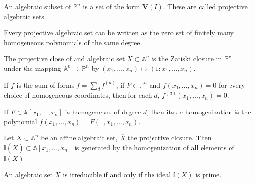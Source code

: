                 \begin{definition}
                    An algebraic subset of $\mathbb{P}^{n}$ is a
                    set of the form $\mathbf{V}(I)$.
                    These are called projective algebraic sets.
                \end{definition}
                \begin{theorem}
                    Every projective algebraic set can be
                    written as the zero set of finitely many
                    homogeneous polynomials of the same degree.
                \end{theorem}
                \begin{definition}
                    The projective close of and algebraic set
                    $X\subset\mathbb{A}^n$ is the Zariski closure
                    in $\mathbb{P}^{n}$ under the mapping
                    $\mathbb{A}^{n}\rightarrow\mathbb{P}^n$
                    by $(x_{1},\hdots,x_{n})\mapsto(1:x_1,\hdots, x_n)$.
                \end{definition}
                \begin{theorem}
                    If $f$ is the sum of forms $f=\sum_{d}f^{(d)}$,
                    if $P\in \mathbb{P}^n$ and $f(x_1,\hdots, x_n)=0$
                    for every choice of homogeneous coordinates,
                    then for each $d$, $f^{(d)}(x_1,\hdots, x_n)=0$.
                \end{theorem}
                \begin{definition}
                    If $F\in \mathbb{A}[x_1,\hdots, x_n]$ is homogeneous
                    of degree $d$, then its de-homogenization is the
                    polynomial $f(x_1,\hdots, x_n)=F(1,x_1,\hdots, x_n)$.
                \end{definition}
                \begin{theorem}
                    Let $X\subset \mathbb{A}^n$ be an affine
                    algebraic set, $\overline{X}$ the projective closure. Then
                    $\mathbb{I}(\overline{X})\subset\mathbb{A}[x_1,\hdots,x_n]$
                    is generated by the homogenization of all
                    elements of $\mathbb{I}(X)$.
                \end{theorem}
                \begin{theorem}
                    An algebraic set $X$ is irreducible
                    if and only if the ideal $\mathbb{I}(X)$ is prime.
                \end{theorem}
